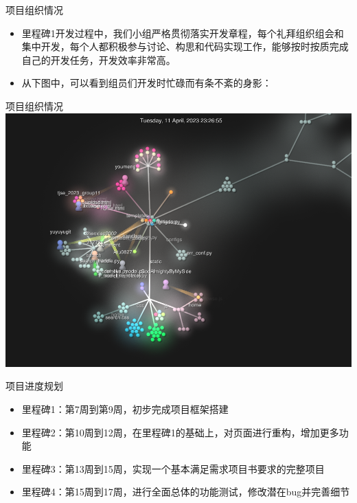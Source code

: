 \begin{frame}{项目组织情况}
    \begin{itemize}
        \item 里程碑1开发过程中，我们小组严格贯彻落实开发章程，每个礼拜组织组会和集中开发，每个人都积极参与讨论、构思和代码实现工作，能够按时按质完成自己的开发任务，开发效率非常高。
        \item 从下图中，可以看到组员们开发时忙碌而有条不紊的身影：
    \end{itemize}
\end{frame}

\begin{frame}{项目组织情况}
    \includegraphics[width=1\textwidth]{contents/figure/commits.png}
\end{frame}

\begin{frame}{项目进度规划}
    \begin{itemize}
        \item 里程碑1：第7周到第9周，初步完成项目框架搭建
        \item 里程碑2：第10周到12周，在里程碑1的基础上，对页面进行重构，增加更多功能
        \item 里程碑3：第13周到15周，实现一个基本满足需求项目书要求的完整项目
        \item 里程碑4：第15周到17周，进行全面总体的功能测试，修改潜在bug并完善细节
    \end{itemize}
\end{frame}